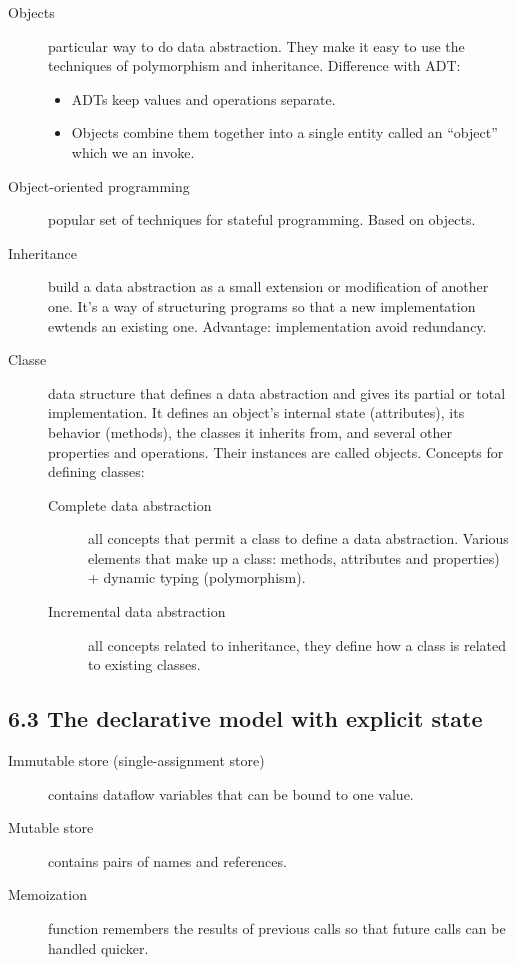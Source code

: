 \begin{description}
  \item[Objects] particular way to do data abstraction.
    They make it easy to use the techniques of polymorphism and inheritance.
    Difference with ADT:
    \begin{itemize}
      \item ADTs keep values and operations separate.
      \item Objects combine them together into a single entity called an ``object'' which we an invoke.
    \end{itemize}
  \item[Object-oriented programming] popular set of techniques for stateful programming.
    Based on objects.
  \item[Inheritance] build a data abstraction as a small extension or modification of another one.
    It's a way of structuring programs so that a new implementation ewtends an existing one.
    Advantage: implementation avoid redundancy.
  \item[Classe] data structure that defines a data abstraction and gives its partial or total implementation.
    It defines an object's internal state (attributes), its behavior (methods), the classes it inherits from, and several other properties and operations.
    Their instances are called objects.
    Concepts for defining classes:
    \begin{description}
      \item[Complete data abstraction] all concepts that permit a class to define a data abstraction.
        Various elements that make up a class: methods, attributes and properties) + dynamic typing (polymorphism).
      \item[Incremental data abstraction] all concepts related to inheritance, they define how a class is related to existing classes.
    \end{description}
\end{description}

\subsection{6.3 The declarative model with explicit state}

\begin{description}
  \item[Immutable store (single-assignment store)] contains dataflow variables that can be bound to one value.
  \item[Mutable store]  contains pairs of names and references.
  \item[Memoization] function remembers the results of previous calls so that future calls can be handled quicker.
\end{description}




